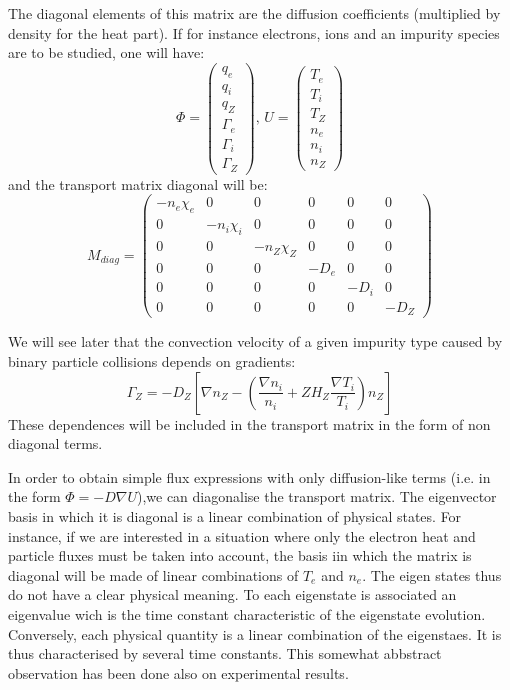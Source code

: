 The diagonal elements of this matrix are the diffusion coefficients (multiplied by density for the heat part). If for instance  electrons, ions and an impurity species are to be studied, one will have: 
	\[
	\Phi = \left(
								\begin{array}{c}
									q_e				\\
									q_i				\\
									q_Z				\\
									\Gamma_e	\\
									\Gamma_i	\\
									\Gamma_Z
								\end{array}
					\right)
		\mbox{, }
		U = \left(
								\begin{array}{c}
									T_e				\\
									T_i				\\
									T_Z				\\
									n_e				\\
									n_i				\\
									n_Z
								\end{array}
				 \right)
\]
and the transport matrix diagonal will be:
	\[
	M_{diag} = 	\left(
								\begin{array}{cccccc}
									-n_e\chi_e	&				0			&				0			&		0		&		0		&		0		\\
											0				&	-n_i\chi_i	&				0		 	& 	0 	&		0		&		0		\\
											0				&				0			&	-n_Z\chi_Z	& 	0 	&		0		&		0		\\
											0				&				0			& 			0			&	-D_e	&		0		&		0		\\
											0				&				0			&				0			&		0		&	-D_i	&		0		\\
											0				&				0			&				0			&		0		&		0		&	-D_Z
								\end{array}
							\right)
\]

We will see later that the convection velocity of a given impurity type caused by binary particle collisions depends on gradients:
	\[
		\Gamma_Z = -D_Z \left[	
													\nabla n_Z - \left(	
																					\frac{ \nabla n_i}{n_i} + ZH_Z \frac{\nabla T_i}{T_i}
																			 \right) n_Z
										\right]
\]
These dependences will be included in the transport matrix in the form of non diagonal terms.

In order to obtain simple flux expressions with only diffusion-like terms (i.e. in the form $\Phi = -D\nabla U$),we can diagonalise the transport matrix. The eigenvector basis in which it is diagonal is a linear combination of physical states. For instance, if we are interested in a situation where only the electron heat and particle fluxes must be taken into account, the basis iin which the matrix is diagonal will be made of linear combinations of $T_e$ and $n_e$. The eigen states thus do not have a clear physical meaning. To each eigenstate is associated an eigenvalue wich is the time constant characteristic of the eigenstate evolution. Conversely, each physical quantity is a linear combination of the eigenstaes. It is thus characterised by several time constants. This somewhat abbstract observation has been done also on experimental results.

